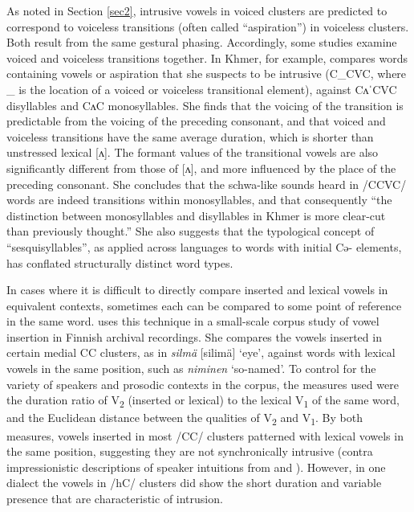 \documentclass[output=paper,colorlinks,citecolor=brown]{langscibook}
\begin{document}
As noted in Section \ref{sec2}, intrusive vowels in voiced clusters are predicted to correspond to voiceless transitions (often called “aspiration”) in voiceless clusters. Both result from the same gestural phasing. Accordingly, some studies examine voiced and voiceless transitions together. In Khmer, for example, \citet{butler2015approaching} compares words containing vowels or aspiration that she suspects to be intrusive (C\_CVC, where \_ is the location of a voiced or voiceless transitional element), against CʌˈCVC disyllables and CʌC monosyllables. She finds that the voicing of the transition is predictable from the voicing of the preceding consonant, and that voiced and voiceless transitions have the same average duration, which is shorter than unstressed lexical [ʌ]. The formant values of the transitional vowels are also significantly different from those of [ʌ], and more influenced by the place of the preceding consonant. She concludes that the schwa-like sounds heard in /CCVC/ words are indeed transitions within monosyllables, and that consequently “the distinction between monosyllables and disyllables in Khmer is more clear-cut than previously thought.” She also suggests that the typological concept of “sesquisyllables”, as applied across languages to words with initial Cə- elements, has conflated structurally distinct word types. 

In cases where it is difficult to directly compare inserted and lexical vowels in equivalent contexts, sometimes each can be compared to some point of reference in the same word. \citet{Karlin2021} uses this technique in a small-scale corpus study of vowel insertion in Finnish archival recordings. She compares the vowels inserted in certain medial CC clusters, as in \textit{silmä} [silimä] ‘eye’, against words with lexical vowels in the same position, such as \textit{niminen} ‘so-named’. To control for the variety of speakers and prosodic contexts in the corpus, the measures used were the duration ratio of V\textsubscript{2} (inserted or lexical) to the lexical V\textsubscript{1} of the same word, and the Euclidean distance between the qualities of V\textsubscript{2} and V\textsubscript{1}. By both measures, vowels inserted in most /CC/ clusters patterned with lexical vowels in the same position, suggesting they are not synchronically intrusive (contra impressionistic descriptions of speaker intuitions from \cite[74]{harms1976segmentalization} and \cite[28]{wiik1965finnish}). However, in one dialect the vowels in /hC/ clusters did show the short duration and variable presence that are characteristic of intrusion. 
\end{document}
